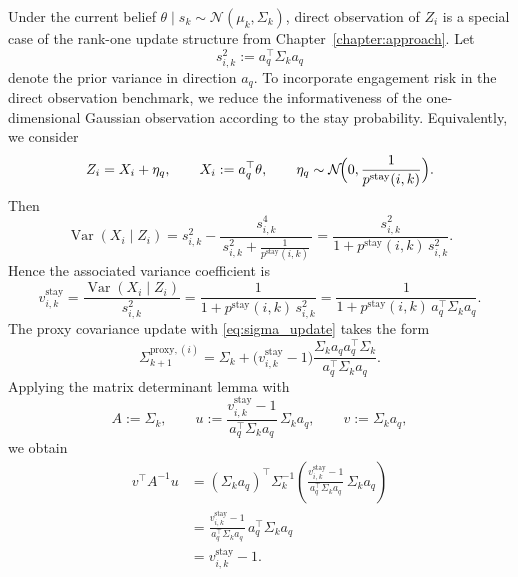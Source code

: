 \documentclass{article}
\begin{document}
Under the current belief $\theta\mid s_k\sim\mathcal N(\mu_k,\Sigma_k)$, direct
observation of $Z_i$  is a special case of the rank-one update structure
from Chapter~\ref{chapter:approach}. 
Let
\begin{equation*}
s_{i,k}^2:=a_q^\top\Sigma_k a_q
\end{equation*}
denote the prior variance in direction $a_q$. To incorporate engagement risk in the
direct observation benchmark, we reduce the informativeness of the one-dimensional
Gaussian observation according to the stay probability.  Equivalently, we consider
\begin{equation*}
Z_i=X_i+\eta_q,
\qquad
X_i:=a_q^\top\theta,
\qquad
\eta_q\sim\mathcal N\!\Bigl(0,\frac{1}{p^{\text{stay}}(i,k)}\Bigr).
\end{equation*}
Then
\begin{equation*}
\operatorname{Var}(X_i\mid Z_i)
=
s_{i,k}^2
-
\frac{s_{i,k}^4}{\,s_{i,k}^2+\frac{1}{p^{\text{stay}}(i,k)}\,}
=
\frac{s_{i,k}^2}{1+p^{\text{stay}}(i,k)\,s_{i,k}^2}.
\end{equation*}
Hence the associated variance coefficient is
\begin{equation*}
v_{i,k}^{\text{stay}}
=
\frac{\operatorname{Var}(X_i\mid Z_i)}{s_{i,k}^2}
=
\frac{1}{1+p^{\text{stay}}(i,k)\,s_{i,k}^2}
=
\frac{1}{1+p^{\text{stay}}(i,k)\,a_q^\top\Sigma_k a_q}.
\end{equation*}
The proxy covariance update with \eqref{eq:sigma_update} takes the form
\begin{equation*}
\Sigma_{k+1}^{\text{proxy},(i)}
=
\Sigma_k
+
\bigl(v_{i,k}^{\text{stay}}-1\bigr)
\frac{\Sigma_k a_q a_q^\top\Sigma_k}{a_q^\top\Sigma_k a_q}.
\end{equation*}
Applying the matrix determinant lemma
with
\begin{equation*}
A:=\Sigma_k,
\qquad
u:=
\frac{v_{i,k}^{\text{stay}}-1}{a_q^\top\Sigma_k a_q}\,\Sigma_k a_q,
\qquad
v:=\Sigma_k a_q,
\end{equation*}
we obtain
\begin{equation*}
\begin{aligned}
v^\top A^{-1}u
&=
(\Sigma_k a_q)^\top \Sigma_k^{-1}
\left(
\frac{v_{i,k}^{\text{stay}}-1}{a_q^\top\Sigma_k a_q}\,\Sigma_k a_q
\right) \\
&=
\frac{v_{i,k}^{\text{stay}}-1}{a_q^\top\Sigma_k a_q}\,
a_q^\top\Sigma_k a_q \\
&=
v_{i,k}^{\text{stay}}-1.
\end{aligned}
\end{equation*}
\end{document}
